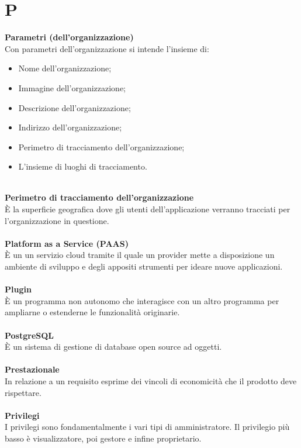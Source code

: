 \section{P}
\textbf{Parametri (dell'organizzazione)}\\
Con parametri dell'organizzazione si intende l'insieme di:
\begin{itemize}
    \item Nome dell'organizzazione;
    \item Immagine dell'organizzazione;
    \item Descrizione dell'organizzazione;
    \item Indirizzo dell'organizzazione;
    \item Perimetro di tracciamento dell'organizzazione;
    \item L'insieme di luoghi di tracciamento.
\end{itemize} 
~\\
\textbf{Perimetro di tracciamento dell'organizzazione}\\
È la superficie geografica dove gli utenti dell'applicazione verranno tracciati per l'organizzazione in questione.\\ \\
\textbf{Platform as a Service (PAAS)}\\
È un un servizio cloud tramite il quale un provider mette a disposizione un ambiente di sviluppo e degli appositi strumenti per ideare nuove applicazioni. \\ \\
\textbf{Plugin}\\
È un programma non autonomo che interagisce con un altro programma per ampliarne o estenderne le funzionalità originarie. \\ \\
\textbf{PostgreSQL}\\
È un sistema di gestione di database open source ad oggetti. \\ \\
\textbf{Prestazionale}\\
In relazione a un requisito esprime dei vincoli di economicità che il prodotto deve rispettare.\\ \\
\textbf{Privilegi}\\
I privilegi sono fondamentalmente i vari tipi di amministratore. Il privilegio più basso è visualizzatore, poi gestore e infine proprietario. \\ \\
